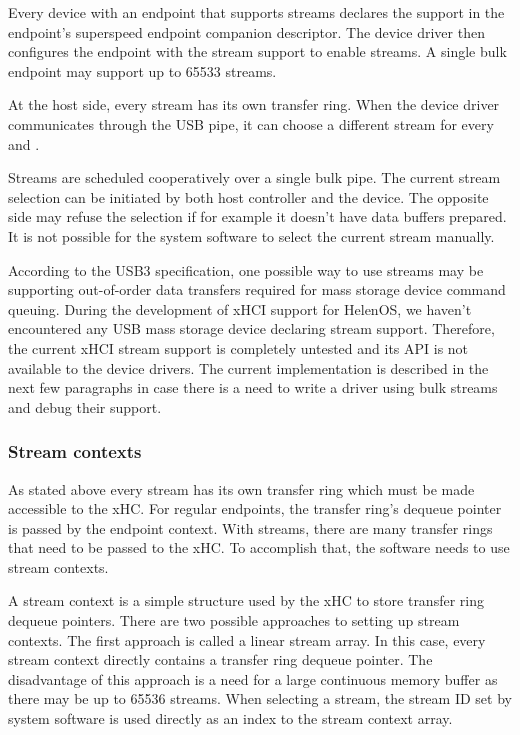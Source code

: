 Every device with an endpoint that supports streams declares the support in the
endpoint's superspeed endpoint companion descriptor. The device driver then
configures the endpoint with the stream support to enable streams. A single
bulk endpoint may support up to 65533 streams.

At the host side, every stream has its own transfer ring. When the device
driver communicates through the USB pipe, it can choose a different stream for
every  and .

Streams are scheduled cooperatively over a single bulk pipe. The current stream
selection can be initiated by both host controller and the device. The opposite
side may refuse the selection if for example it doesn't have data buffers
prepared. It is not possible for the system software to select the current
stream manually.

According to the USB3 specification, one possible way to use streams may be
supporting out-of-order data transfers required for mass storage device command
queuing. During the development of xHCI support for HelenOS, we haven't
encountered any USB mass storage device declaring stream support. Therefore,
the current xHCI stream support is completely untested and its API is not
available to the device drivers. The current implementation is described in the
next few paragraphs in case there is a need to write a driver using bulk
streams and debug their support.

\subsubsection{Stream contexts}

As stated above every stream has its own transfer ring which must be made
accessible to the xHC. For regular endpoints, the transfer ring's dequeue
pointer is passed by the endpoint context. With streams, there are many
transfer rings that need to be passed to the xHC. To accomplish that, the
software needs to use stream contexts.

A stream context is a simple structure used by the xHC to store transfer ring
dequeue pointers. There are two possible approaches to setting up stream
contexts. The first approach is called a linear stream array. In this case,
every stream context directly contains a transfer ring dequeue pointer. The
disadvantage of this approach is a need for a large continuous memory buffer as
there may be up to 65536 streams. When selecting a stream, the stream ID set by
system software is used directly as an index to the stream context array.

